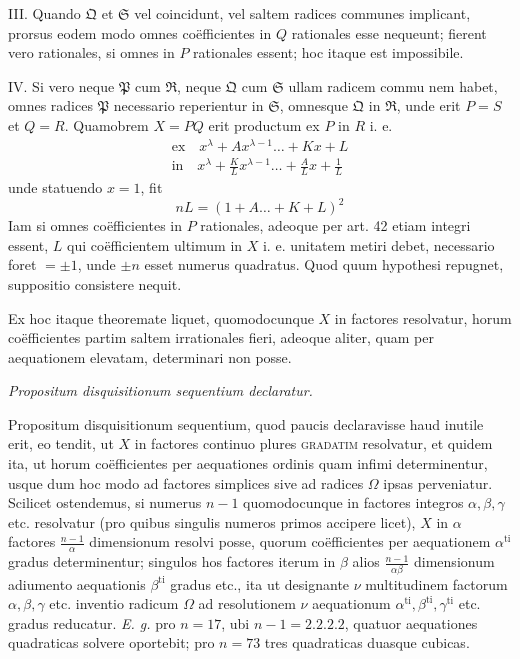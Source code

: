 III. Quando \(\mathfrak Q\) et \(\mathfrak S\) vel coincidunt, vel saltem radices communes implicant, prorsus eodem modo omnes coëfficientes in \(Q\) rationales esse nequeunt; fierent vero rationales, si omnes in \(P\) rationales essent; hoc itaque est impossibile.

IV. Si vero neque \(\mathfrak P\) cum \(\mathfrak R\), neque \(\mathfrak Q\) cum \(\mathfrak S\) ullam radicem commu%
nem habet, omnes radices \(\mathfrak P\) necessario reperientur in \(\mathfrak S\), omnesque \(\mathfrak Q\) in \(\mathfrak R\), unde erit \(P=S\) et \(Q=R\). Quamobrem \(X=PQ\) erit productum ex \(P\) in \(R\) i. e. \[\begin{gathered}
\text{ex}\quad x^\lambda+Ax^{\lambda-1}\ldots+Kx+L\\
\text{in}\quad x^\lambda+\frac KLx^{\lambda-1}\ldots+\frac ALx+\frac1L
\end{gathered}\] unde statuendo \(x=1\), fit \[nL=(1+A\ldots+K+L)^2\] Iam si omnes coëfficientes in \(P\) rationales, adeoque per art. 42 etiam integri essent, \(L\) qui coëfficientem ultimum in \(X\) i. e. unitatem metiri debet, necessario foret \(=\pm1\), unde \(\pm n\) esset numerus quadratus. Quod quum hypothesi repugnet, suppositio consistere nequit.

Ex hoc itaque theoremate liquet, quomodocunque \(X\) in factores resolvatur, horum coëfficientes partim saltem irrationales fieri, adeoque aliter, quam per aequationem elevatam, determinari non posse.

\begin{center}\textit{Propositum disquisitionum sequentium declaratur.}\end{center}


Propositum disquisitionum sequentium, quod paucis declaravisse haud inutile erit, eo tendit, ut \(X\) in factores continuo plures \textsc{gradatim} resolvatur, et quidem ita, ut horum coëfficientes per aequationes ordinis quam infimi determinentur, usque dum hoc modo ad factores simplices sive ad radices \(\Omega\) ipsas perveniatur. Scilicet ostendemus, si numerus \(n-1\) quomodocunque in factores integros \(\alpha,\allowbreak \beta,\allowbreak \gamma\) etc. resolvatur (pro quibus singulis numeros primos accipere licet), \(X\) in \(\alpha\) factores \(\frac{n-1}{\alpha}\) dimensionum resolvi posse, quorum coëfficientes per aequationem \(\alpha^{\mathrm{ti}}\) gradus determinentur; singulos hos factores iterum in \(\beta\) alios \(\frac{n-1}{\alpha\beta}\) dimensionum adiumento aequationis \(\beta^{\mathrm{ti}}\) gradus etc., ita ut designante \(\nu\) multitudinem factorum \(\alpha,\allowbreak \beta,\allowbreak \gamma\) etc. inventio radicum \(\Omega\) ad resolutionem \(\nu\) aequationum \(\alpha^{\mathrm{ti}},\allowbreak \beta^{\mathrm{ti}},\allowbreak \gamma^{\mathrm{ti}}\) etc. gradus reducatur. \textit{E. g.} pro \(n=17\), ubi \(n-1=2.2.2.2\), quatuor aequationes quadraticas solvere oportebit; pro \(n=73\) tres quadraticas duasque cubicas.

